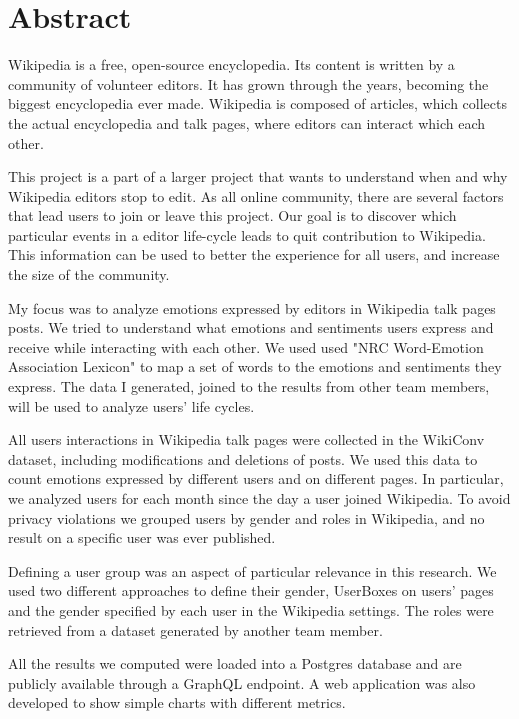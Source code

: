 \chapter*{Abstract} %
\label{Abstract}


Wikipedia is a free, open-source encyclopedia. Its content is written by a community of volunteer editors. It has grown through the years, becoming the biggest encyclopedia ever made. Wikipedia is composed of articles, which collects the actual encyclopedia and talk pages, where editors can interact which each other.

This project is a part of a larger project that wants to understand when and why Wikipedia editors stop to edit. As all online community, there are several factors that lead users to join or leave this project. Our goal is to discover which particular events in a editor life-cycle leads to quit contribution to Wikipedia. This information can be used to better the experience for all users, and increase the size of the community.

My focus was to analyze emotions expressed by editors in Wikipedia talk pages posts. We tried to understand what emotions and sentiments users express and receive while interacting with each other. We used used "NRC Word-Emotion Association Lexicon" to map a set of words to the emotions and sentiments they express. The data I generated, joined to the results from other team members, will be used to analyze users' life cycles.

All users interactions in Wikipedia talk pages were collected in the WikiConv dataset, including modifications and deletions of posts. We used this data to count emotions expressed by different users and on different pages. In particular, we analyzed users for each month since the day a user joined Wikipedia. To avoid privacy violations we grouped users by gender and roles in Wikipedia, and no result on a specific user was ever published.

Defining a user group was an aspect of particular relevance in this research. We used two different approaches to define their gender, UserBoxes on users' pages and the gender specified by each user in the Wikipedia settings. The roles were retrieved from a dataset generated by another team member.


All the results we computed were loaded into a Postgres database and are publicly available through a GraphQL endpoint. A web application was also developed to show simple charts with different metrics.